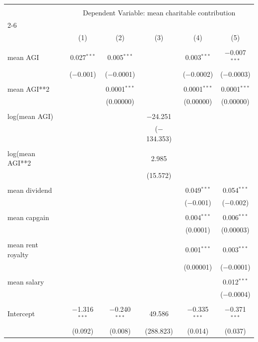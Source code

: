 \documentclass{article}
\begin{document}
\begingroup 
\tiny 
\begin{tabular}{@{\extracolsep{.001pt}}lccccc} 
\\[-1.8ex]\hline 
\hline \\[-1.8ex] 
 & \multicolumn{5}{c}{Dependent Variable: mean charitable contribution} \\ 
\cline{2-6} 
\\[-1.8ex] & (1) & (2) & (3) & (4) & (5)\\ 
\hline \\[-1.8ex] 
 mean AGI & 0.027$^{***}$ & 0.005$^{***}$ &  & 0.003$^{***}$ & $-$0.007$^{***}$ \\ 
  & ($-$0.001) & ($-$0.0001) &  & ($-$0.0002) & ($-$0.0003) \\ 
  & & & & & \\ 
 mean AGI**2 &  & 0.0001$^{***}$ &  & 0.0001$^{***}$ & 0.0001$^{***}$ \\ 
  &  & (0.00000) &  & (0.00000) & (0.00000) \\ 
  & & & & & \\ 
 log(mean AGI) &  &  & $-$24.251 &  &  \\ 
  &  &  & ($-$134.353) &  &  \\ 
  & & & & & \\ 
 log(mean AGI**2 &  &  & 2.985 &  &  \\ 
  &  &  & (15.572) &  &  \\ 
  & & & & & \\ 
 mean dividend &  &  &  & 0.049$^{***}$ & 0.054$^{***}$ \\ 
  &  &  &  & ($-$0.001) & ($-$0.002) \\ 
  & & & & & \\ 
 mean capgain &  &  &  & 0.004$^{***}$ & 0.006$^{***}$ \\ 
  &  &  &  & (0.0001) & (0.00003) \\ 
  & & & & & \\ 
 mean rent royalty &  &  &  & 0.001$^{***}$ & 0.003$^{***}$ \\ 
  &  &  &  & (0.00001) & ($-$0.0001) \\ 
  & & & & & \\ 
 mean salary &  &  &  &  & 0.012$^{***}$ \\ 
  &  &  &  &  & ($-$0.0004) \\ 
  & & & & & \\ 
 Intercept & $-$1.316$^{***}$ & $-$0.240$^{***}$ & 49.586 & $-$0.335$^{***}$ & $-$0.371$^{***}$ \\ 
  & (0.092) & (0.008) & (288.823) & (0.014) & (0.037) \\ 

\end{tabular}
\end{document}
